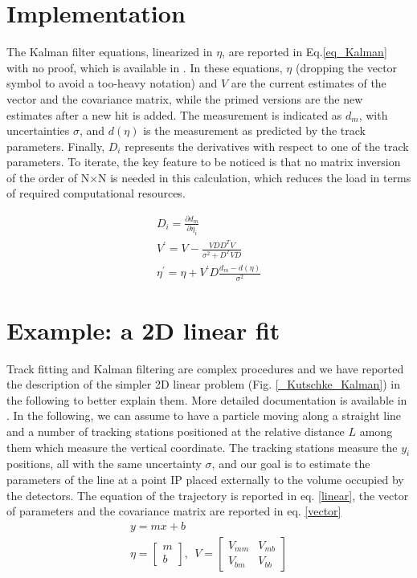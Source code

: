 \begin{refsection}
\section{Implementation}
    The Kalman filter equations, linearized in $\eta$, are reported in Eq.\ref{eq_Kalman} with no proof, which is available in \cite{KutschkePaper}. 
    In these equations, $\eta$ (dropping the vector symbol to avoid a too-heavy notation) and $V$ are the current estimates of the vector and the covariance matrix, while the primed versions are the new estimates after a new hit is added. 
    The measurement is indicated as $d_m$, with uncertainties $\sigma$, and $d(\eta)$ is the measurement as predicted by the track parameters. 
    Finally, $D_i$ represents the derivatives with respect to one of the track parameters. 
    To iterate, the key feature to be noticed is that no matrix inversion of the order of N$\times$N is needed in this calculation, which reduces the load in terms of required computational resources.

    \begin{equation}
        \begin{gathered}
            D_i = \frac{\partial d_m}{\partial \eta_i} \\
            V^\prime = V - \frac{VDD^TV}{\sigma^2+D^TVD}\\
            \eta^\prime = \eta + V^\prime D \frac{d_m-d(\eta)}{\sigma^2}
        \end{gathered} 
        \label{eq_Kalman}
    \end{equation}

\section{Example: a 2D linear fit}
    \label{2Dfit}
    Track fitting and Kalman filtering are complex procedures and we have reported the description of the simpler 2D linear problem (Fig. \ref{_Kutschke_Kalman}) in the following to better explain them. 
    More detailed documentation is available in \cite{Kutschke} \cite{KutschkePaper}. 
    In the following, we can assume to have a particle moving along a straight line and a number of tracking stations positioned at the relative distance $L$ among them which measure the vertical coordinate.
    The tracking stations measure the $y_i$ positions, all with the same uncertainty $\sigma$, and our goal is to estimate the parameters of the line at a point IP placed externally to the volume occupied by the detectors.
    The equation of the trajectory is reported in eq. \ref{linear}, the vector of parameters and the covariance matrix are reported in eq. \ref{vector}
    \begin{gather}
        y = mx +b \label{linear}\\
        \eta = \begin{bmatrix} m \\  b \end{bmatrix},\ \ V=\begin{bmatrix} V_{mm}& V_{mb} \\ V_{bm}& V_{bb} \end{bmatrix} \label{vector}
    \end{gather}  


\end{refsection}
